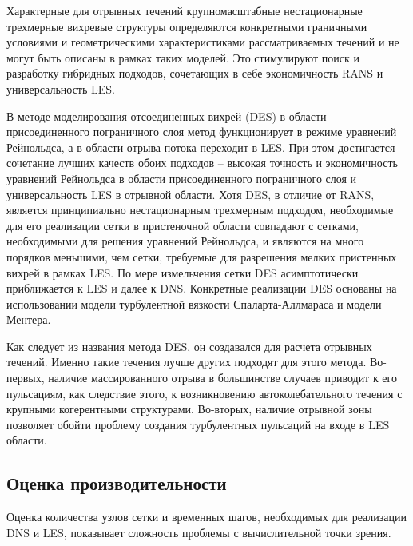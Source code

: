 	Характерные для отрывных течений крупномасштабные нестационарные трехмерные вихревые структуры определяются конкретными граничными условиями и геометрическими характеристиками рассматриваемых течений и не могут быть описаны в рамках таких моделей. Это стимулируют поиск и разработку гибридных подходов, сочетающих в себе экономичность RANS и универсальность LES.
	
	В методе моделирования отсоединенных вихрей (DES) в области присоединенного пограничного слоя метод функционирует в режиме уравнений Рейнольдса, а в области отрыва потока переходит в LES. При этом достигается сочетание лучших качеств обоих подходов -- высокая точность и экономичность уравнений Рейнольдса в области присоединенного пограничного слоя и универсальность LES в отрывной области. Хотя DES, в отличие от RANS, является принципиально нестационарным трехмерным подходом, необходимые для его реализации сетки в пристеночной области совпадают с сетками, необходимыми для решения уравнений Рейнольдса, и являются на много порядков меньшими, чем сетки, требуемые для разрешения мелких пристенных вихрей в рамках LES. По мере измельчения сетки DES асимптотически приближается к LES и далее к DNS. Конкретные реализации DES основаны на использовании модели турбулентной вязкости Спаларта-Аллмараса и модели Ментера\cite{Strelets2001}.
	
	Как следует из названия метода DES, он создавался для расчета отрывных течений. Именно такие течения лучше других подходят для этого метода. Во-первых, наличие массированного отрыва в большинстве случаев приводит к его пульсациям, как следствие этого, к возникновению автоколебательного течения с крупными когерентными структурами. Во-вторых, наличие отрывной зоны позволяет обойти проблему создания турбулентных пульсаций на входе в LES области.

\subsection{Оценка производительности}
	
	Оценка количества узлов сетки и временных шагов, необходимых для реализации DNS и LES, показывает сложность проблемы с вычислительной точки зрения.
	
